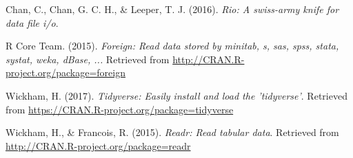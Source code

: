 \documentclass[12pt,oneside]{reedthesis}
\theoremstyle{definition}
\theoremstyle{definition}
\theoremstyle{definition}
\theoremstyle{remark}
\begin{document}
  \noindent
  
  \setlength{\parindent}{-0.20in} \setlength{\leftskip}{0.20in}
  \setlength{\parskip}{8pt}
  
  \hypertarget{refs}{}
  \hypertarget{ref-chanetal2016}{}
  Chan, C., Chan, G. C. H., \& Leeper, T. J. (2016). \emph{Rio: A
  swiss-army knife for data file i/o}.
  
  \hypertarget{ref-rcoreteam2015foreign}{}
  R Core Team. (2015). \emph{Foreign: Read data stored by minitab, s, sas,
  spss, stata, systat, weka, dBase, ...} Retrieved from
  \url{http://CRAN.R-project.org/package=foreign}
  
  \hypertarget{ref-wickham2017}{}
  Wickham, H. (2017). \emph{Tidyverse: Easily install and load the
  'tidyverse'}. Retrieved from
  \url{https://CRAN.R-project.org/package=tidyverse}
  
  \hypertarget{ref-wickhamfrancois2015}{}
  Wickham, H., \& Francois, R. (2015). \emph{Readr: Read tabular data}.
  Retrieved from \url{http://CRAN.R-project.org/package=readr}


\end{document}
